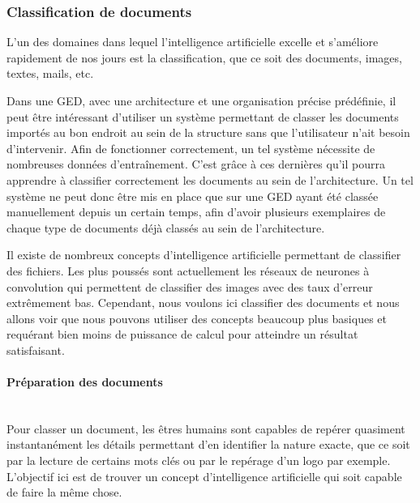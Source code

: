 \subsubsection{Classification de documents}

L'un des domaines dans lequel l'intelligence artificielle excelle et s'améliore rapidement de nos jours est la classification, que ce soit des documents, images, textes, mails, etc.

Dans une GED, avec une architecture et une organisation précise prédéfinie, il peut être intéressant d'utiliser un système permettant de classer les documents importés au bon endroit au sein de la structure sans que l'utilisateur n'ait besoin d'intervenir.
Afin de fonctionner correctement, un tel système nécessite de nombreuses données d'entraînement.
C'est grâce à ces dernières qu'il pourra apprendre à classifier correctement les documents au sein de l'architecture.
Un tel système ne peut donc être mis en place que sur une GED ayant été classée manuellement depuis un certain temps, afin d'avoir plusieurs exemplaires de chaque type de documents déjà classés au sein de l'architecture.

Il existe de nombreux concepts d'intelligence artificielle permettant de classifier des fichiers.
Les plus poussés sont actuellement les réseaux de neurones à convolution qui permettent de classifier des images avec des taux d'erreur extrêmement bas.
Cependant, nous voulons ici classifier des documents et nous allons voir que nous pouvons utiliser des concepts beaucoup plus basiques et requérant bien moins de puissance de calcul pour atteindre un résultat satisfaisant.

\paragraph*{Préparation des documents}
~\\

Pour classer un document, les êtres humains sont capables de repérer quasiment instantanément les détails permettant d'en identifier la nature exacte, que ce soit par la lecture de certains mots clés ou par le repérage d'un logo par exemple.
L'objectif ici est de trouver un concept d'intelligence artificielle qui soit capable de faire la même chose.

